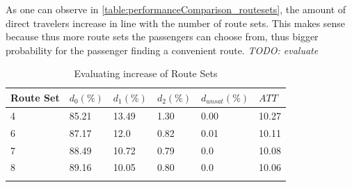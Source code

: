 As one can observe in \vref{table:performanceComparison_routesets}, the amount of direct travelers increase in line with the number of route sets. This makes sense because thus more route sets the passengers can choose from, thus bigger probability for the passenger finding a convenient route. \emph{\color{blue} TODO: evaluate} 

 \begin{table}[H]
    \centering
    \begin{tabular}{|l||l|l|l|l|l|}
    \hline
    Route Set & $d_0(\%)$ & $d_1(\%)$ & $d_2(\%)$ & $d_{unsat}(\%)$ & $ATT$ \\
    \hline
    4 & 85.21 & 13.49 & 1.30 & 0.00 & 10.27\\
    6 & 87.17 & 12.0 & 0.82 & 0.01 & 10.11\\
    7 & 88.49 & 10.72 & 0.79 & 0.0 & 10.08\\
    8 & 89.16 & 10.05 & 0.80 & 0.0 & 10.06\\\\
    \hline
    \end{tabular}
    \caption {Evaluating increase of Route Sets}
    \label{table:performanceComparison_routesets}
\end{table}

